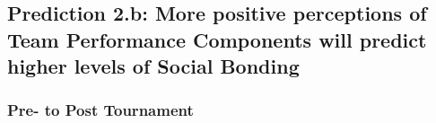 \begin{CJK}{UTF8}{gbsn}
      \subsection{Prediction 2.b: More positive perceptions of Team Performance Components will predict higher levels of Social Bonding}












      \subsubsection{Pre- to Post Tournament\label{app8:MLM23b}}




\end{CJK}
